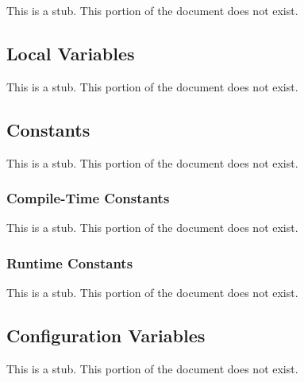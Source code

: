 This is a stub.  This portion of the document does not exist.

\subsection{Local Variables}
\label{Local_Variables}

This is a stub.  This portion of the document does not exist.

\subsection{Constants}
\label{Constants}

This is a stub.  This portion of the document does not exist.

\subsubsection{Compile-Time Constants}
\label{Compile-Time_Constants}

This is a stub.  This portion of the document does not exist.

\subsubsection{Runtime Constants}
\label{Runtime_Constants}

This is a stub.  This portion of the document does not exist.

\subsection{Configuration Variables}
\label{Configuration_Variables}

This is a stub.  This portion of the document does not exist.
